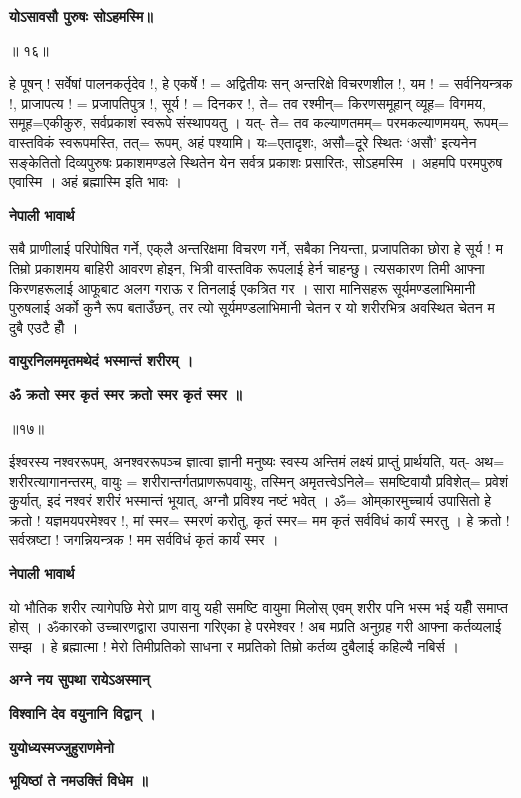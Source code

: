 \documentclass[11pt, a5paper]{article}
\begin{document}
\textbf{योऽसावसौ पुरुषः सोऽहमस्मि॥}

॥ १६॥

हे पूषन् ! सर्वेषां पालनकर्तृदेव !, हे एकर्षे‍ ! = अद्वितीयः सन् अन्तरिक्षे विचरणशील !, यम ! = सर्वनियन्त्रक !, प्राजापत्य ! = प्रजापतिपुत्र !, सूर्य ! = दिनकर !, ते= तव रश्मीन्= किरणसमूहान् व्यूह= विगमय, समूह=एकीकुरु, सर्वप्रकाशं स्वरूपे संस्थापयतु । यत्- ते= तव कल्याणतमम्= परमकल्याणमयम्, रूपम्= वास्तविकं स्वरूपमस्ति, तत्= रूपम्, अहं पश्यामि। यः=एतादृशः, असौ=दूरे स्थितः ‘असौ’ इत्यनेन सङ्केतितो दिव्यपुरुषः प्रकाशमण्डले स्थितेन येन सर्वत्र प्रकाशः प्रसारितः, सोऽहमस्मि । अहमपि परमपुरुष एवास्मि । अहं ब्रह्मास्मि इति भावः ।

\textbf{नेपाली भावार्थ}

सबै प्राणीलाई परिपोषित गर्ने, एक्‌लै अन्तरिक्षमा विचरण गर्ने, सबैका नियन्ता, प्रजापतिका छोरा हे सूर्य ! म तिम्रो प्रकाशमय बाहिरी आवरण होइन, भित्री वास्तविक रूपलाई हेर्न चाहन्छु। त्यसकारण तिमी आफ्ना किरणहरूलाई आफूबाट अलग गराऊ र तिनलाई एकत्रित गर । सारा मानिसहरू सूर्यमण्डलाभिमानी पुरुषलाई अर्को कुनै रूप बताउँछन्, तर त्यो सूर्यमण्डलाभिमानी चेतन र यो शरीरभित्र अवस्थित चेतन म दुबै एउटै हौँ ।

\textbf{वायुरनिलममृतमथेदं भस्मान्तं शरीरम् ।}

\textbf{ॐ क्रतो स्मर कृतं स्मर क्रतो स्मर कृतं स्मर ॥}

॥१७॥

ईश्वरस्य नश्वररूपम्, अनश्वररूपञ्च ज्ञात्वा ज्ञानी मनुष्यः स्वस्य अन्तिमं लक्ष्यं प्राप्तुं प्रार्थयति, यत्- अथ= शरीरत्यागानन्तरम्, वायुः = शरीरान्तर्गतप्राणरूपवायुः, तस्मिन् अमृतत्त्वेऽनिले‍= समष्टिवायौ प्रविशेत्= प्रवेशं कुुर्यात्, इदं नश्वरं शरीरं भस्मान्तं भूयात्, अग्नौ प्रविश्य नष्टं भवेत् । ॐ= ओम्‌कारमुच्चार्य उपासितो हे क्रतो ! यज्ञमयपरमेश्वर !, मां स्मर= स्मरणं करोतु, कृतं स्मर‍= मम कृतं सर्वविधं कार्यं स्मरतु । हे क्रतो ! सर्वस्रष्टा ! जगन्नियन्त्रक ! मम सर्वविधं कृतं कार्यं स्मर ।

\textbf{नेपाली भावार्थ}

यो भौतिक शरीर त्यागेपछि मेरो प्राण वायु यही समष्टि वायुमा मिलोस् एवम् शरीर पनि भस्म भई यहीँ समाप्त होस् । ॐकारको उच्चारणद्वारा उपासना गरिएका हे परमेश्वर ! अब मप्रति अनुग्रह गरी आफ्ना कर्तव्यलाई सम्झ । हे ब्रह्मात्मा ! मेरो तिमीप्रतिको साधना र मप्रतिको तिम्रो कर्तव्य दुबैलाई कहिल्यै नबिर्स ।

\textbf{अग्ने नय सुपथा रायेऽअस्मान्}

\textbf{विश्वानि देव वयुनानि विद्वान् ।}

\textbf{युयोध्यस्मज्जुहुराणमेनो}

\textbf{भूयिष्ठां ते नमउक्तिं विधेम ॥}
\end{document}
